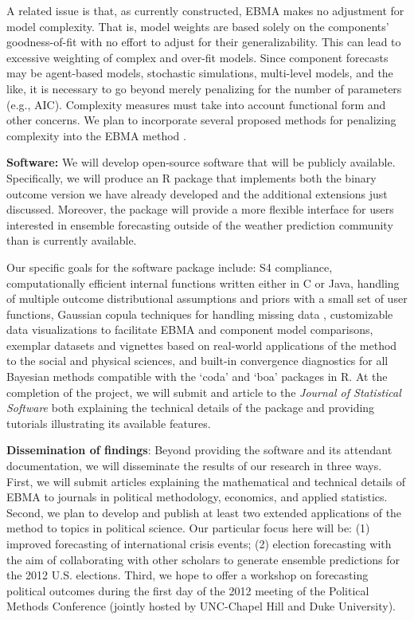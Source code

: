 \documentclass[pdftex,12pt,fullpage,oneside]{amsart}
\begin{document}
A related issue is that, as currently constructed, EBMA makes no
adjustment for model complexity. That is, model weights are based
solely on the components’ goodness-of-fit with no effort to adjust for
their generalizability. This can lead to excessive weighting of
complex and over-fit models. Since component forecasts may be
agent-based models, stochastic simulations, multi-level models, and
the like, it is necessary to go beyond merely penalizing for the
number of parameters (e.g., AIC). Complexity measures must take into
account functional form and other concerns. We plan to incorporate
several proposed methods for penalizing complexity into the EBMA
method \citep[c.f.,][]{Pitt:2002a, Pitt:2002b, Spiegelhalter:2002}.

\textbf{Software:} We will develop open-source software that will be
publicly available.  Specifically, we will produce an R package that
implements both the binary outcome version we have already developed
and the additional extensions just discussed.  Moreover, the package
will provide a more flexible interface for users interested in
ensemble forecasting outside of the weather prediction community than
is currently available.  

Our specific goals for the software package include: S4 compliance,
computationally efficient internal functions written either in C or
Java, handling of multiple outcome distributional assumptions and
priors with a small set of user functions, Gaussian copula techniques
for handling missing data \citep{Hoff:2007}, customizable data
visualizations to facilitate EBMA and component model comparisons,
exemplar datasets and vignettes based on real-world applications of
the method to the social and physical sciences, and built-in
convergence diagnostics for all Bayesian methods compatible with the
`coda' and `boa' packages in R.  At the completion of the project, we
will submit and article to the \textit{Journal of Statistical
  Software} both explaining the technical details of the package and
providing tutorials illustrating its available features.

\textbf{Dissemination of findings}: Beyond providing the software and
its attendant documentation, we will disseminate the results of our
research in three ways.  First, we will submit articles explaining the
mathematical and technical details of EBMA to journals in political
methodology, economics, and applied statistics.  Second, we plan to
develop and publish at least two extended applications of the method
to topics in political science.  Our particular focus here will be:
(1) improved forecasting of international crisis events; (2) election
forecasting with the aim of collaborating with other scholars to
generate ensemble predictions for the 2012 U.S. elections.  Third, we
hope to offer a workshop on forecasting political outcomes during the
first day of the 2012 meeting of the Political Methods Conference
(jointly hosted by UNC-Chapel Hill and Duke University).
\end{document}
